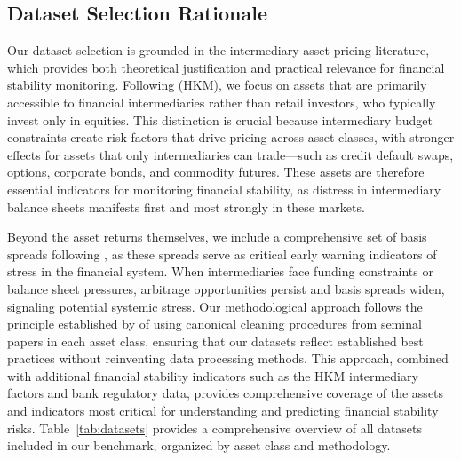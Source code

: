 \documentclass{article}
\begin{document}
\subsection{Dataset Selection Rationale}
Our dataset selection is grounded in the intermediary asset pricing literature, which provides both theoretical justification and practical relevance for financial stability monitoring. Following \citet{He2017} (HKM), we focus on assets that are primarily accessible to financial intermediaries rather than retail investors, who typically invest only in equities. This distinction is crucial because intermediary budget constraints create risk factors that drive pricing across asset classes, with stronger effects for assets that only intermediaries can trade—such as credit default swaps, options, corporate bonds, and commodity futures. These assets are therefore essential indicators for monitoring financial stability, as distress in intermediary balance sheets manifests first and most strongly in these markets.

Beyond the asset returns themselves, we include a comprehensive set of basis spreads following \citet{Siriwardane2021}, as these spreads serve as critical early warning indicators of stress in the financial system. When intermediaries face funding constraints or balance sheet pressures, arbitrage opportunities persist and basis spreads widen, signaling potential systemic stress. Our methodological approach follows the principle established by \citet{He2017} of using canonical cleaning procedures from seminal papers in each asset class, ensuring that our datasets reflect established best practices without reinventing data processing methods. This approach, combined with additional financial stability indicators such as the HKM intermediary factors and bank regulatory data, provides comprehensive coverage of the assets and indicators most critical for understanding and predicting financial stability risks. Table~\ref{tab:datasets} provides a comprehensive overview of all datasets included in our benchmark, organized by asset class and methodology. 
\end{document}
